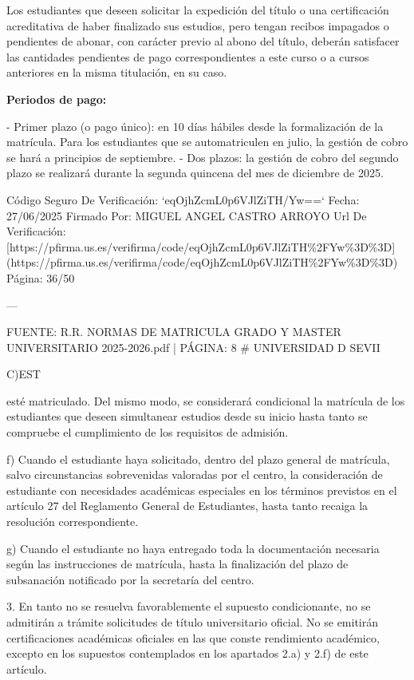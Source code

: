 \documentclass{article}
\begin{document}
\begin{itemize}
\begin{itemize}
\begin{scriptsize}
                  Los estudiantes que deseen solicitar la expedición del título o una certificación acreditativa de haber finalizado sus estudios, pero tengan recibos impagados o pendientes de abonar, con carácter previo al abono del título, deberán satisfacer las cantidades pendientes de pago correspondientes a este curso o a cursos anteriores en la misma titulación, en su caso.

                  \textbf{Periodos de pago:}

                  - Primer plazo (o pago único): en 10 días hábiles desde la formalización de la matrícula. Para los estudiantes que se automatriculen en julio, la gestión de cobro se hará a principios de septiembre.
                  - Dos plazos: la gestión de cobro del segundo plazo se realizará durante la segunda quincena del mes de diciembre de 2025.

                  Código Seguro De Verificación: `eqOjhZcmL0p6VJlZiTH/Yw==`
                  Fecha: 27/06/2025
                  Firmado Por: MIGUEL ANGEL CASTRO ARROYO
                  Url De Verificación: [https://pfirma.us.es/verifirma/code/eqOjhZcmL0p6VJlZiTH\%2FYw\%3D\%3D](https://pfirma.us.es/verifirma/code/eqOjhZcmL0p6VJlZiTH\%2FYw\%3D\%3D)
                  Página: 36/50

                  ---

                  FUENTE: R.R. NORMAS DE MATRICULA GRADO Y MASTER UNIVERSITARIO 2025-2026.pdf | PÁGINA: 8
                  \# UNIVERSIDAD D SEVII

                  C)EST

                  esté matriculado. Del mismo modo, se considerará condicional la matrícula de los estudiantes que deseen simultanear estudios desde su inicio hasta tanto se compruebe el cumplimiento de los requisitos de admisión.

                  f) Cuando el estudiante haya solicitado, dentro del plazo general de matrícula, salvo circunstancias sobrevenidas valoradas por el centro, la consideración de estudiante con necesidades académicas especiales en los términos previstos en el artículo 27 del Reglamento General de Estudiantes, hasta tanto recaiga la resolución correspondiente.

                  g) Cuando el estudiante no haya entregado toda la documentación necesaria según las instrucciones de matrícula, hasta la finalización del plazo de subsanación notificado por la secretaría del centro.

                  3. En tanto no se resuelva favorablemente el supuesto condicionante, no se admitirán a trámite solicitudes de título universitario oficial. No se emitirán certificaciones académicas oficiales en las que conste rendimiento académico, excepto en los supuestos contemplados en los apartados 2.a) y 2.f) de este artículo.


\end{scriptsize}
\end{itemize}
\end{itemize}
\end{document}

